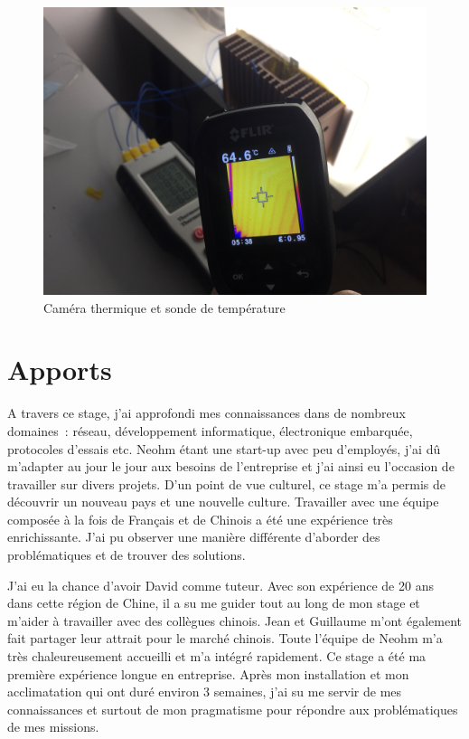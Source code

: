 \documentclass[a4paper, 12pt, sffamily]{report}
\begin{document}
\begin{figure}[H]
\centering
\includegraphics[scale=0.08]{figures/photos/thermal_camera.jpg}
\caption{Caméra thermique et sonde de température}
\label{fig:temp_test}
\end{figure}



\chapter{Apports}

A travers ce stage, j'ai approfondi mes connaissances dans de nombreux domaines~: réseau, développement informatique, électronique embarquée, protocoles d'essais etc. Neohm étant une start-up avec peu d'employés, j'ai dû m'adapter au jour le jour aux besoins de l'entreprise et j'ai ainsi eu l'occasion de travailler sur divers projets. D'un point de vue culturel, ce stage m'a permis de découvrir un nouveau pays et une nouvelle culture. Travailler avec une équipe composée à la fois de Français et de Chinois a été une expérience très enrichissante. J'ai pu observer une manière différente d'aborder des problématiques et de trouver des solutions.

J'ai eu la chance d'avoir David comme tuteur. Avec son expérience de 20 ans dans cette région de Chine, il a su me guider tout au long de mon stage et m'aider à travailler avec des collègues chinois. Jean et Guillaume m'ont également fait partager leur attrait pour le marché chinois. Toute l'équipe de Neohm m'a très chaleureusement accueilli et m'a intégré rapidement.
Ce stage a été ma première expérience longue en entreprise. Après mon installation et mon acclimatation qui ont duré environ 3 semaines, j'ai su me servir de mes connaissances et surtout de mon pragmatisme pour répondre aux problématiques de mes missions.
\end{document}
